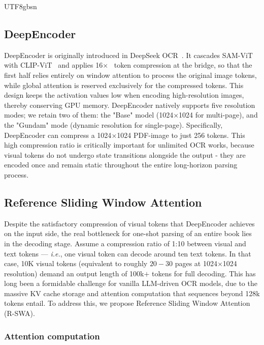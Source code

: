 \documentclass[11pt, a4paper, logo, copyright, nonumbering]{deepseek}
\begin{document}
\begin{CJK*}{UTF8}{gbsn}
\subsection{DeepEncoder}
DeepEncoder is originally introduced in DeepSeek OCR~\cite{wei2025deepseek}. It cascades SAM-ViT~\cite{kirillov2023segment} with CLIP-ViT~\cite{radford2021learning} and applies 16$\times$~\cite{wei2024vary} token compression at the bridge, so that the first half relies entirely on window attention to process the original image tokens, while global attention is reserved exclusively for the compressed tokens. This design keeps the activation values low when encoding high-resolution images, thereby conserving GPU memory. DeepEncoder natively supports five resolution modes; we retain two of them:  the "Base" model (1024×1024 for multi-page), and the "Gundam" mode (dynamic resolution for single-page). Specifically, DeepEncoder can compress a 1024$\times$1024 PDF-image to just 256 tokens. This high compression ratio is critically important for unlimited OCR works, because visual tokens do not undergo state transitions alongside the output - they are encoded once and remain static throughout the entire long-horizon parsing process.



\subsection{Reference Sliding Window Attention}


Despite the satisfactory compression of visual tokens that DeepEncoder achieves on the input side, the real bottleneck for one-shot parsing of an entire book lies in the decoding stage. Assume a compression ratio of 1:10 between visual and text tokens — \textit{i.e.}, one visual token can decode around ten text tokens. In that case, 10K visual tokens (equivalent to roughly $20-30$ pages at 1024$\times$1024 resolution) demand an output length of 100k$+$ tokens for full decoding. This has long been a formidable challenge for vanilla LLM-driven OCR models, due to the massive KV cache storage and attention computation that sequences beyond 128k tokens entail. To address this, we propose Reference Sliding Window Attention (R-SWA).

\subsubsection{Attention computation}


\end{CJK*}
\end{document}
